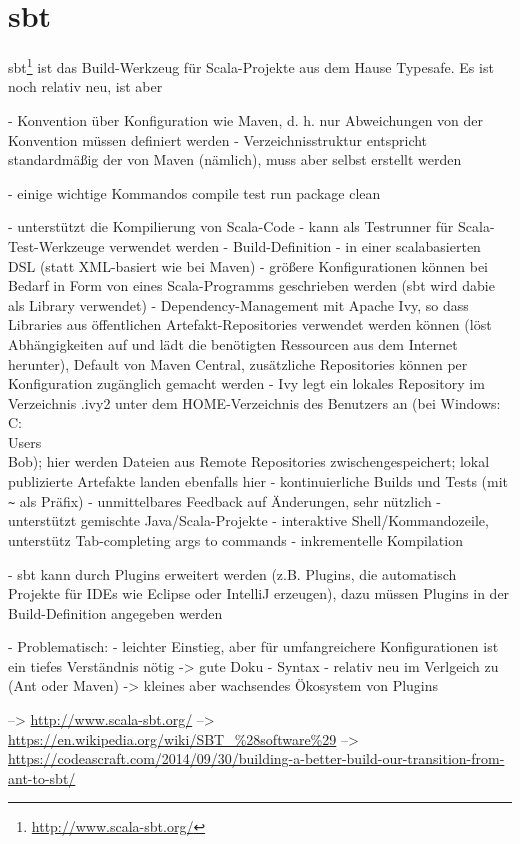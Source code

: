 \documentclass[a4paper, 12pt, listof=totoc, bibliography=totoc]{scrreprt}
\begin{document}
\section{sbt}

sbt\footnote{\url{http://www.scala-sbt.org/}} ist das Build-Werkzeug für Scala-Projekte aus dem Hause Typesafe. Es ist noch relativ neu, ist aber 

- Konvention über Konfiguration wie Maven, d. h. nur Abweichungen von der Konvention müssen definiert werden
- Verzeichnisstruktur entspricht standardmäßig der von Maven (nämlich), muss aber selbst erstellt werden

- einige wichtige Kommandos
	compile
	test
	run
	package
	clean

- unterstützt die Kompilierung von Scala-Code
- kann als Testrunner für Scala-Test-Werkzeuge verwendet werden
- Build-Definition
	- in einer scalabasierten DSL (statt XML-basiert wie bei Maven)
	- größere Konfigurationen können bei Bedarf in Form von eines Scala-Programms geschrieben werden (sbt wird dabie als Library verwendet)
- Dependency-Management mit Apache Ivy, so dass Libraries aus öffentlichen Artefakt-Repositories verwendet werden können (löst Abhängigkeiten auf und lädt die benötigten Ressourcen aus dem Internet herunter), Default von Maven Central, zusätzliche Repositories können per Konfiguration zugänglich gemacht werden
	- Ivy legt ein lokales Repository im Verzeichnis .ivy2 unter dem HOME-Verzeichnis des Benutzers an (bei Windows: C:\\Users\\Bob); hier werden Dateien aus Remote Repositories zwischengespeichert; lokal publizierte Artefakte landen ebenfalls hier
- kontinuierliche Builds und Tests (mit \texttt{\textasciitilde} als Präfix) - unmittelbares Feedback auf Änderungen, sehr nützlich
- unterstützt gemischte Java/Scala-Projekte
- interaktive Shell/Kommandozeile, unterstütz Tab-completing args to commands
- inkrementelle Kompilation

- sbt kann durch Plugins erweitert werden (z.B. Plugins, die automatisch Projekte für IDEs wie Eclipse oder IntelliJ erzeugen), dazu müssen Plugins in der Build-Definition angegeben werden

- Problematisch:
	- leichter Einstieg, aber für umfangreichere Konfigurationen ist ein tiefes Verständnis nötig -> gute Doku
	- Syntax
	- relativ neu im Verlgeich zu (Ant oder Maven) -> kleines aber wachsendes Ökosystem von Plugins

-->  \url{http://www.scala-sbt.org/}
-->  \url{https://en.wikipedia.org/wiki/SBT_%28software%29}
-->  \url{https://codeascraft.com/2014/09/30/building-a-better-build-our-transition-from-ant-to-sbt/}
\end{document}
